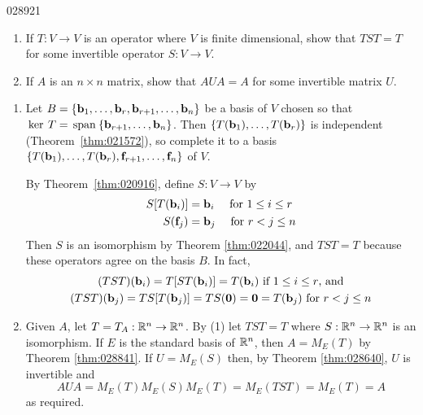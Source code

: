 \begin{example}{}{028921}
\begin{enumerate}
\item If $T : V \to V$ is an operator where $V$ is finite dimensional, show that $TST = T$ for some invertible operator $S : V \to V$.

\item If $A$ is an $n \times n$ matrix, show that $AUA = A$ for some invertible matrix $U$.

\end{enumerate}

\begin{solution}
\begin{enumerate}
\item Let $B = \{\textbf{b}_{1}, \dots, \textbf{b}_{r}, \textbf{b}_{r+1}, \dots, \textbf{b}_{n}\}$ be a basis of $V$ chosen so that $\thinspace\operatorname{ker \medspace}T = \thinspace\operatorname{span\medspace}\{\textbf{b}_{r+1}, \dots, \textbf{b}_{n}\}$. Then $\{T(\textbf{b}_{1}), \dots, T(\textbf{b}_{r})\}$ is independent (Theorem~\ref{thm:021572}), so complete it to a basis $\{T(\textbf{b}_{1}), \dots, T(\textbf{b}_{r}), \textbf{f}_{r+1}, \dots, \textbf{f}_{n}\}$ of $V$.


By Theorem~\ref{thm:020916}, define $S : V \to V$ by
\begin{align*}
S[T(\textbf{b}_i)] & = \textbf{b}_i \quad \mbox{ for } 1 \leq i \leq r \\
S(\textbf{f}_j) & = \textbf{b}_j \quad \mbox{ for } r < j \leq n
\end{align*}
Then $S$ is an isomorphism by Theorem \ref{thm:022044}, and $TST = T$ because these operators agree on the basis $B$. In fact,
\begin{gather*}
(TST)(\textbf{b}_i) = T[ST(\textbf{b}_i)] = T(\textbf{b}_i) \mbox{ if } 1 \leq i \leq r \mbox{, and} \\
(TST)(\textbf{b}_j) = TS[T(\textbf{b}_j)] = TS(\textbf{0}) = \textbf{0} = T(\textbf{b}_j) \mbox{ for } r < j \leq n
\end{gather*}

\item Given $A$, let $T = T_{A} : \mathbb{R}^n \to \mathbb{R}^n$. By (1) let $TST = T$ where $S : \mathbb{R}^n \to \mathbb{R}^n$ is an isomorphism. If $E$ is the standard basis of $\mathbb{R}^n$, then $A = M_{E}(T)$ by Theorem \ref{thm:028841}. If $U = M_{E}(S)$ then, by Theorem \ref{thm:028640}, $U$ is invertible and
\begin{equation*}
AUA = M_E(T)M_E(S)M_E(T) = M_E(TST) = M_E(T) = A
\end{equation*}
as required.

\end{enumerate}
\end{solution}
\end{example}

